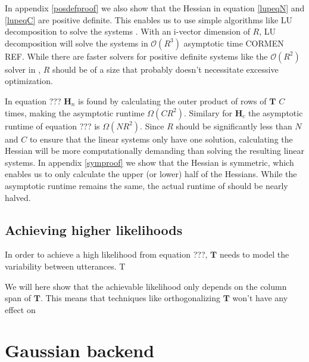 In appendix \ref{posdefproof} we also show that the Hessian in equation \ref{lupeqN} and \ref{lupeqC} are positive definite. This enables us to use simple algorithms like LU decomposition to solve the systems \cite[p. 749]{cormen}. With an i-vector dimension of $R$, LU decomposition will solve the systems in $\mathcal{O}(R^3)$ asymptotic time CORMEN REF. While there are faster solvers for positive definite systems like the $\mathcal{O}(R^2)$ solver in \cite{tewfik1994fast}, $R$ should be of a size that probably doesn't necessitate excessive optimization.

In equation ??? $\mathbf{H}_n$ is found by calculating the outer product of rows of $\mathbf{T}$ $C$ times, making the asymptotic runtime $\Omega(CR^2)$. Similary for $\mathbf{H}_c$ the asymptotic runtime of equation ??? is  $\Omega(NR^2)$. Since $R$ should be significantly less than $N$ and $C$ to ensure that the linear systems only have one solution, calculating the Hessian will be more computationally demanding than solving the resulting linear systems. In appendix \ref{symproof} we show that the Hessian is symmetric, which enables us to only calculate the upper (or lower) half of the Hessians. While the asymptotic runtime remains the same, the actual runtime of should be nearly halved.

\subsection{Achieving higher likelihoods}

In order to achieve a high likelihood from equation ???, $\mathbf{T}$ needs to model the variability between utterances. T

We will here show that the achievable likelihood only depends on the column span of $\mathbf{T}$. This means that techniques like orthogonalizing $\mathbf{T}$ won't have any effect on 




\section{Gaussian backend}


